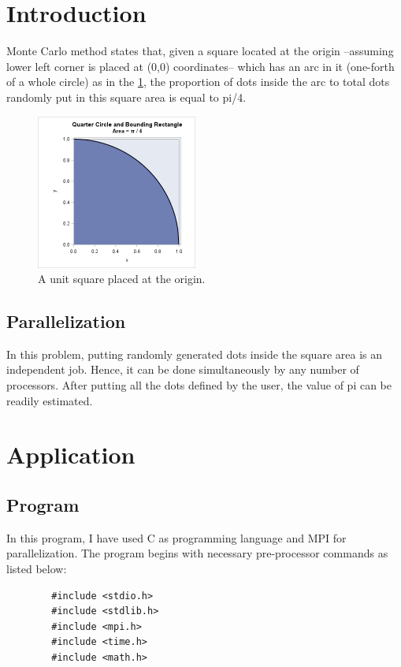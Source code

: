 \documentclass[12pt,a4paper]{article}
\begin{document}
    
    \newpage

    \tableofcontents
    \newpage


    \section{Introduction}
    Monte Carlo method states that, given a square located at the origin --assuming lower left corner is placed at (0,0) coordinates-- which has an
    arc in it (one-forth of a whole circle) as in the \figurename{} \ref{fig:sq}, the proportion of dots inside the arc to total dots randomly put in this square area is equal to pi/4. \cite{llnl}

    \begin{figure}[!h]
        \begin{center}
            \includegraphics[width=200px]{resimler/arc.png}
            \caption{A unit square placed at the origin. \cite{arc}}
            \label{fig:sq}
        \end{center}
    \end{figure}

    \subsection{Parallelization}
    In this problem, putting randomly generated dots inside the square area is an independent job. Hence, it can be done simultaneously
    by any number of processors. After putting all the dots defined by the user, the value of pi can be readily estimated.

    \section{Application}
    \subsection{Program}
        In this program, I have used C as programming language and MPI for parallelization.
        The program begins with necessary pre-processor commands as listed below:
        \begin{lstlisting}
        #include <stdio.h>
        #include <stdlib.h>
        #include <mpi.h>
        #include <time.h>
        #include <math.h>
        \end{lstlisting}
\end{document}

